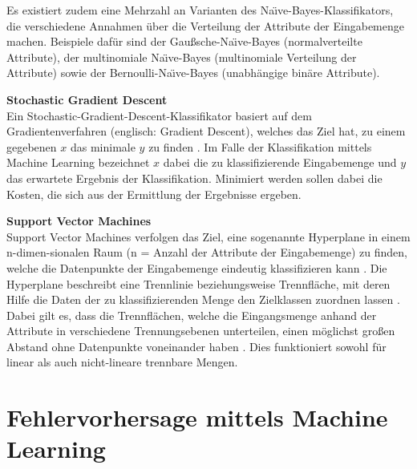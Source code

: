 Es existiert zudem eine Mehrzahl an Varianten des Na\"{\i}ve-Bayes-Klassifikators, die verschiedene Annahmen über die Verteilung der Attribute der Eingabemenge machen. Beispiele dafür sind der Gaußsche-Na\"{\i}ve-Bayes (normalverteilte Attribute), der multinomiale Na\"{\i}ve-Bayes (multinomiale Verteilung der Attribute) sowie der Bernoulli-Na\"{\i}ve-Bayes (unabhängige binäre Attribute).

\textbf{Stochastic Gradient Descent\medskip}\\
Ein Stochastic-Gradient-Descent-Klassifikator basiert auf dem Gradientenverfahren (englisch: Gradient Descent), welches das Ziel hat, zu einem gegebenen $x$ das minimale $y$ zu finden \cite{Srinivasan2019}. Im Falle der Klassifikation mittels Machine Learning bezeichnet $x$ dabei die zu klassifizierende Eingabemenge und $y$ das erwartete Ergebnis der Klassifikation. Minimiert werden sollen dabei die \glqq Kosten\grqq{}, die sich aus der Ermittlung der Ergebnisse ergeben.

\textbf{Support Vector Machines\medskip}\\
Support Vector Machines verfolgen das Ziel, eine sogenannte \glqq Hyperplane\grqq{} in einem n-dimen-sionalen Raum (n = Anzahl der Attribute der Eingabemenge) zu finden, welche die Datenpunkte der Eingabemenge eindeutig klassifizieren kann \cite{Gandhi2018}. Die Hyperplane beschreibt eine Trennlinie beziehungsweise Trennfläche, mit deren Hilfe die Daten der zu klassifizierenden Menge den Zielklassen zuordnen lassen \cite{Luber2019}. Dabei gilt es, dass die Trennflächen, welche die Eingangsmenge anhand der Attribute in verschiedene Trennungsebenen unterteilen, einen möglichst großen Abstand ohne Datenpunkte voneinander haben \cite{Luber2019}. Dies funktioniert sowohl für linear als auch nicht-lineare trennbare Mengen.

\section{Fehlervorhersage mittels Machine Learning}

